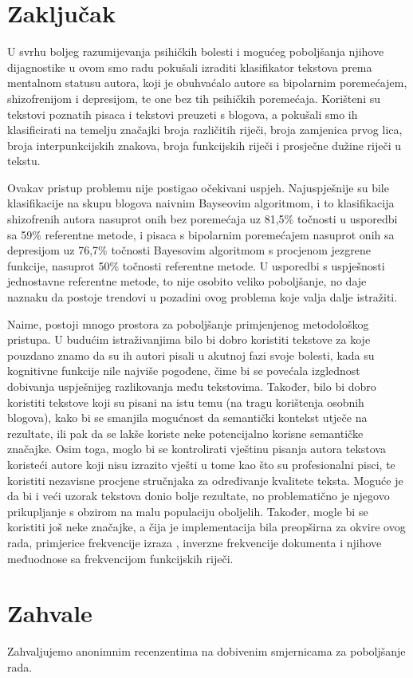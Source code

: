 \documentclass[10pt, a4paper]{article}
\begin{document}
\section{Zaključak}

U svrhu boljeg razumijevanja psihičkih bolesti i mogućeg poboljšanja njihove dijagnostike u ovom smo radu pokušali izraditi klasifikator tekstova prema mentalnom statusu autora, koji je obuhvaćalo autore sa bipolarnim poremećajem, shizofrenijom i depresijom, te one bez tih psihičkih poremećaja. Korišteni su tekstovi poznatih pisaca i tekstovi preuzeti s blogova, a pokušali smo ih klasificirati na temelju značajki broja različitih riječi, broja zamjenica prvog lica, broja interpunkcijskih znakova, broja funkcijskih riječi i prosječne dužine riječi u tekstu. 

Ovakav pristup problemu nije postigao očekivani uspjeh. Najuspješnije su bile klasifikacije na skupu blogova naivnim Bayseovim algoritmom, i to klasifikacija shizofrenih autora nasuprot onih bez poremećaja uz 81,5\% točnosti u usporedbi sa 59\% referentne metode, i pisaca s bipolarnim poremećajem nasuprot onih sa depresijom uz 76,7\% točnosti Bayesovim algoritmom s procjenom jezgrene funkcije, nasuprot 50\% točnosti referentne metode. U usporedbi s uspješnosti jednostavne referentne metode, to nije osobito veliko poboljšanje, no daje naznaku da postoje trendovi u pozadini ovog problema koje valja dalje istražiti. 

Naime, postoji mnogo prostora za poboljšanje primjenjenog metodološkog pristupa. U budućim istraživanjima bilo bi dobro koristiti tekstove za koje pouzdano znamo da su ih autori pisali u akutnoj fazi svoje bolesti, kada su kognitivne funkcije nile najviše pogođene, čime bi se povećala izglednost dobivanja uspješnijeg razlikovanja među tekstovima. Također, bilo bi dobro koristiti tekstove koji su pisani na istu temu (na tragu korištenja osobnih blogova), kako bi se smanjila mogućnost da semantički kontekst utječe na rezultate, ili pak da se lakše koriste neke potencijalno korisne semantičke značajke. Osim toga, moglo bi se kontrolirati vještinu pisanja autora tekstova koristeći autore koji nisu izrazito vješti u tome kao što su profesionalni pisci, te koristiti nezavisne procjene stručnjaka za određivanje kvalitete teksta. Moguće je da bi i veći uzorak tekstova donio bolje rezultate, no problematično je njegovo prikupljanje s obzirom na malu populaciju oboljelih. Također, mogle bi se koristiti još neke značajke, a čija je implementacija bila preopširna za okvire ovog rada, primjerice frekvencije izraza , inverzne frekvencije dokumenta  i njihove međuodnose sa frekvencijom funkcijskih riječi.

\section*{Zahvale}
Zahvaljujemo anonimnim recenzentima na dobivenim smjernicama za poboljšanje rada.


 
\end{document}
